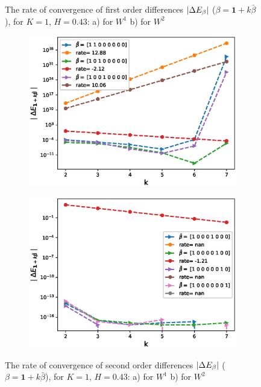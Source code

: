 \documentclass[11pt]{article}
\begin{document}
\begin{figure}[h!]
	
	
	\caption{The rate of convergence of  first order differences $\left\lvert\Delta E_{\beta}\right\rvert$ ($\beta=\mathbf{1}+k \bar{\beta}$), for $K=1$, $H=0.43$: a) for $W^1$ b) for $W^2$}
	\label{fig:first_diff_comp_K_1_H_043_wihtout_change_measure}
\end{figure}


\begin{figure}[h!]
	\centering
	\begin{subfigure}{.4\textwidth}
		\centering
		\includegraphics[width=1\linewidth]{./figures/rBergomi_mixed_error_rates/without_change_measure/N_4/H_043/mixed_difference_order2_rbergomi_4steps_H_043_K_1_totally_hierarch_with_rate_W1}
		\caption{}
		\label{fig:sub3}
	\end{subfigure}%
	\begin{subfigure}{.4\textwidth}
		\centering
		\includegraphics[width=1\linewidth]{./figures/rBergomi_mixed_error_rates/without_change_measure/N_4/H_043/mixed_difference_order2_rbergomi_4steps_H_043_K_1_totally_hierarch_with_rate_W2}
		\caption{}
		\label{fig:sub4}
	\end{subfigure}
	
	\caption{The rate of convergence of  second order differences $\left\lvert\Delta E_{\beta}\right\rvert$ ($\beta=\mathbf{1}+k \bar{\beta}$), for $K=1$, $H=0.43$: a) for $W^1$ b) for $W^2$}
	\label{fig:second_diff_comp_K_1_H_043_wihtout_change_measure}
\end{figure}
\end{document}

